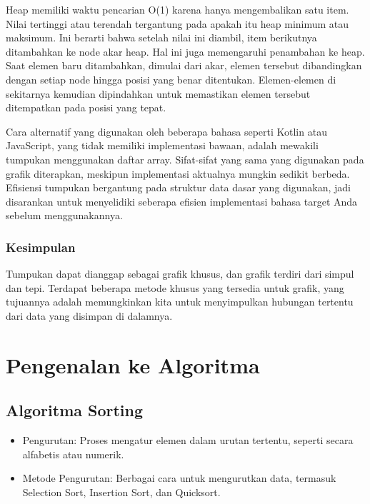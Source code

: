 \documentclass{article}
\begin{document}
Heap memiliki waktu pencarian O(1) karena hanya mengembalikan satu item. Nilai tertinggi atau terendah tergantung pada apakah itu heap minimum atau maksimum. Ini berarti bahwa setelah nilai ini diambil, item berikutnya ditambahkan ke node akar heap. Hal ini juga memengaruhi penambahan ke heap. Saat elemen baru ditambahkan, dimulai dari akar, elemen tersebut dibandingkan dengan setiap node hingga posisi yang benar ditentukan. Elemen-elemen di sekitarnya kemudian dipindahkan untuk memastikan elemen tersebut ditempatkan pada posisi yang tepat.

Cara alternatif yang digunakan oleh beberapa bahasa seperti Kotlin atau JavaScript, yang tidak memiliki implementasi bawaan, adalah mewakili tumpukan menggunakan daftar array. Sifat-sifat yang sama yang digunakan pada grafik diterapkan, meskipun implementasi aktualnya mungkin sedikit berbeda. Efisiensi tumpukan bergantung pada struktur data dasar yang digunakan, jadi disarankan untuk menyelidiki seberapa efisien implementasi bahasa target Anda sebelum menggunakannya.

\subsubsection{Kesimpulan}
Tumpukan dapat dianggap sebagai grafik khusus, dan grafik terdiri dari simpul dan tepi. Terdapat beberapa metode khusus yang tersedia untuk grafik, yang tujuannya adalah memungkinkan kita untuk menyimpulkan hubungan tertentu dari data yang disimpan di dalamnya.


\newpage

\section{Pengenalan ke Algoritma}
\subsection{Algoritma Sorting}
\begin{itemize}
    \item Pengurutan: Proses mengatur elemen dalam urutan tertentu, seperti secara alfabetis atau numerik.
    \item Metode Pengurutan: Berbagai cara untuk mengurutkan data, termasuk Selection Sort, Insertion Sort, dan Quicksort.
\end{itemize}
\end{document}
